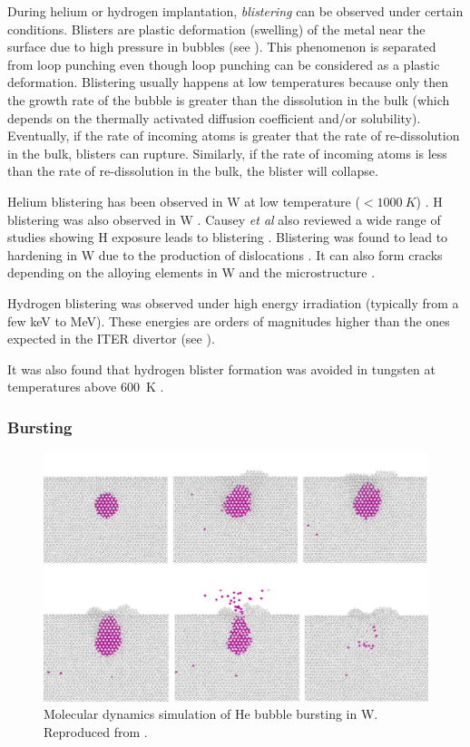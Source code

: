 During helium or hydrogen implantation, \textit{blistering} can be observed under certain conditions.
Blisters are plastic deformation (swelling) of the metal near the surface due to high pressure in bubbles (see ).
This phenomenon is separated from loop punching even though loop punching can be considered as a plastic deformation.
Blistering usually happens at low temperatures because only then the growth rate of the bubble is greater than the dissolution in the bulk (which depends on the thermally activated diffusion coefficient and/or solubility).
Eventually, if the rate of incoming atoms is greater that the rate of re-dissolution in the bulk, blisters can rupture.
Similarly, if the rate of incoming atoms is less than the rate of re-dissolution in the bulk, the blister will collapse.

Helium blistering has been observed in W at low temperature ($< \SI{1000}{K}$) .
H blistering was also observed in W .
Causey \textit{et al} also reviewed a wide range of studies showing H exposure leads to blistering .
Blistering was found to lead to hardening in W due to the production of dislocations .
It can also form cracks depending on the alloying elements in W and the microstructure .

Hydrogen blistering was observed under high energy irradiation (typically from a few \si{keV} to \si{MeV}).
These energies are orders of magnitudes higher than the ones expected in the ITER divertor (see ).

It was also found that hydrogen blister formation was avoided in tungsten at temperatures above \SI{600}{K} .

\subsubsection{Bursting}

\begin{figure} [h!]
    \centering
    \includegraphics[width=\linewidth]{Figures/Chapter1/bubble_bursting_zhou.jpg}
    \caption{Molecular dynamics simulation of He bubble bursting in W. Reproduced from \cite{zhou_growth_2019}.}
\end{figure}

